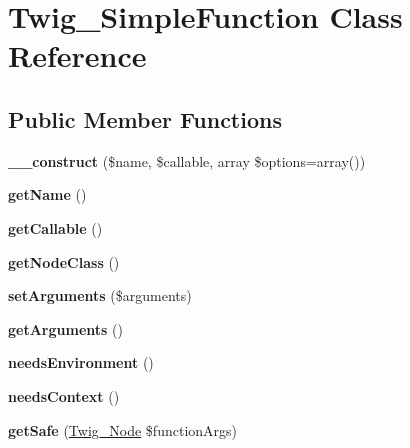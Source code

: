 \hypertarget{class_twig___simple_function}{}\section{Twig\+\_\+\+Simple\+Function Class Reference}
\label{class_twig___simple_function}
\subsection*{Public Member Functions}
\begin{DoxyCompactItemize}
\item 
\hypertarget{class_twig___simple_function_a1e24fc85f3981c10f1e71d93a4f54144}{}{\bfseries \+\_\+\+\_\+construct} (\$name, \$callable, array \$options=array())\label{class_twig___simple_function_a1e24fc85f3981c10f1e71d93a4f54144}

\item 
\hypertarget{class_twig___simple_function_a3d0963e68bb313b163a73f2803c64600}{}{\bfseries get\+Name} ()\label{class_twig___simple_function_a3d0963e68bb313b163a73f2803c64600}

\item 
\hypertarget{class_twig___simple_function_a0be839e0782a38a172c386bd963375c9}{}{\bfseries get\+Callable} ()\label{class_twig___simple_function_a0be839e0782a38a172c386bd963375c9}

\item 
\hypertarget{class_twig___simple_function_a8d85021f1f19e71dd99d7dfdd138c927}{}{\bfseries get\+Node\+Class} ()\label{class_twig___simple_function_a8d85021f1f19e71dd99d7dfdd138c927}

\item 
\hypertarget{class_twig___simple_function_a2b7df0e0f61ee886144db2d59fc0d7da}{}{\bfseries set\+Arguments} (\$arguments)\label{class_twig___simple_function_a2b7df0e0f61ee886144db2d59fc0d7da}

\item 
\hypertarget{class_twig___simple_function_a1d4c324c5a088be98d99d3efbf3502e1}{}{\bfseries get\+Arguments} ()\label{class_twig___simple_function_a1d4c324c5a088be98d99d3efbf3502e1}

\item 
\hypertarget{class_twig___simple_function_a711311882c7dd1058f92f7eb0e8edeeb}{}{\bfseries needs\+Environment} ()\label{class_twig___simple_function_a711311882c7dd1058f92f7eb0e8edeeb}

\item 
\hypertarget{class_twig___simple_function_a52c35bc6da8861f40aa59f1b99f7ef0f}{}{\bfseries needs\+Context} ()\label{class_twig___simple_function_a52c35bc6da8861f40aa59f1b99f7ef0f}

\item 
\hypertarget{class_twig___simple_function_afe45269f2b6ea19ab9503c02ec865655}{}{\bfseries get\+Safe} (\hyperlink{class_twig___node}{Twig\+\_\+\+Node} \$function\+Args)\label{class_twig___simple_function_afe45269f2b6ea19ab9503c02ec865655}

\end{DoxyCompactItemize}
